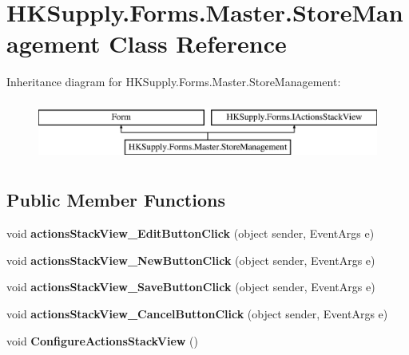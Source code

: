 \hypertarget{class_h_k_supply_1_1_forms_1_1_master_1_1_store_management}{}\section{H\+K\+Supply.\+Forms.\+Master.\+Store\+Management Class Reference}
\label{class_h_k_supply_1_1_forms_1_1_master_1_1_store_management}
Inheritance diagram for H\+K\+Supply.\+Forms.\+Master.\+Store\+Management\+:\begin{figure}[H]
\begin{center}
\leavevmode
\includegraphics[height=2.000000cm]{class_h_k_supply_1_1_forms_1_1_master_1_1_store_management}
\end{center}
\end{figure}
\subsection*{Public Member Functions}
\begin{DoxyCompactItemize}
\item 
\mbox{\label{class_h_k_supply_1_1_forms_1_1_master_1_1_store_management_a3423588318d2f747206eff34fd1168fd}} 
void {\bfseries actions\+Stack\+View\+\_\+\+Edit\+Button\+Click} (object sender, Event\+Args e)
\item 
\mbox{\label{class_h_k_supply_1_1_forms_1_1_master_1_1_store_management_ad513d0db35efd5de069ee7c7f1cd9aa1}} 
void {\bfseries actions\+Stack\+View\+\_\+\+New\+Button\+Click} (object sender, Event\+Args e)
\item 
\mbox{\label{class_h_k_supply_1_1_forms_1_1_master_1_1_store_management_af0af8ae26d581bc291916b5e9c8ddc5c}} 
void {\bfseries actions\+Stack\+View\+\_\+\+Save\+Button\+Click} (object sender, Event\+Args e)
\item 
\mbox{\label{class_h_k_supply_1_1_forms_1_1_master_1_1_store_management_ada75d7ab80b8363fcd8d84c0b80b426f}} 
void {\bfseries actions\+Stack\+View\+\_\+\+Cancel\+Button\+Click} (object sender, Event\+Args e)
\item 
\mbox{\label{class_h_k_supply_1_1_forms_1_1_master_1_1_store_management_aeb4b46af8352b4de5baf2abd6b8105ce}} 
void {\bfseries Configure\+Actions\+Stack\+View} ()
\end{DoxyCompactItemize}
